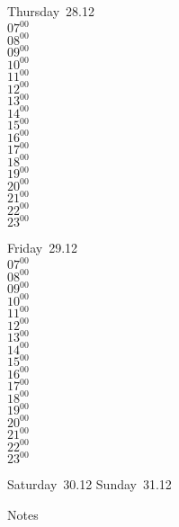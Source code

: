 \documentclass[11pt, a4paper]{book}\usepackage[]{graphicx}\usepackage[]{color}
\begin{document}
\begin{weekdaybox}
  Thursday~28.12\\
  { 
  \vfill
  $07^{00}$\\
$08^{00}$\\
$09^{00}$\\
$10^{00}$\\
$11^{00}$\\
$12^{00}$\\
$13^{00}$\\
$14^{00}$\\
$15^{00}$\\
$16^{00}$\\
$17^{00}$\\
$18^{00}$\\
$19^{00}$\\
$20^{00}$\\
$21^{00}$\\
$22^{00}$\\
$23^{00}$\\
  }
\end{weekdaybox} 
\begin{weekdaybox}
  Friday~29.12\\
  { 
  \vfill
  $07^{00}$\\
$08^{00}$\\
$09^{00}$\\
$10^{00}$\\
$11^{00}$\\
$12^{00}$\\
$13^{00}$\\
$14^{00}$\\
$15^{00}$\\
$16^{00}$\\
$17^{00}$\\
$18^{00}$\\
$19^{00}$\\
$20^{00}$\\
$21^{00}$\\
$22^{00}$\\
$23^{00}$\\
  }
\end{weekdaybox}
\begin{weekendbox}
  Saturday~30.12
  \tcblower
  Sunday~31.12
\end{weekendbox} %
\begin{notebox}
  Notes
\end{notebox}
\clearpage
\end{document}
